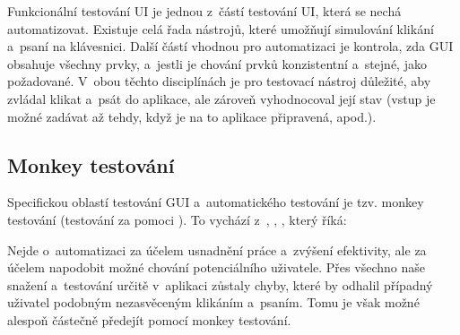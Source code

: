 		Funkcionální testování UI je jednou z~částí testování UI, která se nechá automatizovat. Existuje celá řada nástrojů, které umožňují simulování klikání a~psaní na klávesnici. Další částí vhodnou pro automatizaci je kontrola, zda GUI obsahuje všechny prvky, a~jestli je chování prvků konzistentní a~stejné, jako požadované. V~obou těchto disciplínách je pro testovací nástroj důležité, aby zvládal klikat a~psát do aplikace, ale zároveň vyhodnocoval její stav (vstup je možné zadávat až tehdy, když je na to aplikace připravená, apod.).
		
			\subsection{Monkey testování}\label{MonkeyTestovani}
			Specifickou oblastí testování GUI a~automatického testování je tzv. monkey testování (testování za pomoci ). To vychází z~, \citep{Patton}, \citep{Teorem}, který říká: 
			
			Nejde o~automatizaci za účelem usnadnění práce a~zvýšení efektivity, ale za účelem napodobit možné chování potenciálního uživatele. Přes všechno naše snažení a~testování určitě v~aplikaci zůstaly chyby, které by odhalil případný uživatel podobným nezasvěceným klikáním a~psaním. Tomu je však možné alespoň částečně předejít pomocí monkey testování.